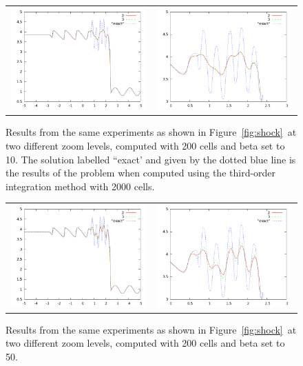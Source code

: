 \documentclass[10pt]{article}
\begin{document}
\begin{figure}
  \begin{center}
	\begin{tabular}{cc}
      \includegraphics[width=.475\textwidth]{10.png} &
	  \includegraphics[width=.475\textwidth]{10zoom.png}
	\end{tabular}
  \end{center}
  \caption{Results from the same experiments as shown in Figure~\ref{fig:shock}~at two different zoom levels, computed with 200 cells and beta set to 10. The solution labelled ``exact' and given by the dotted blue line is the results of the problem when computed using the third-order integration method with 2000 cells.}
\end{figure}

\begin{figure}
  \begin{center}
	\begin{tabular}{cc}
      \includegraphics[width=.475\textwidth]{50.png} &
	  \includegraphics[width=.475\textwidth]{50zoom.png}
	\end{tabular}
  \end{center}
  \caption{Results from the same experiments as shown in Figure~\ref{fig:shock}~at two different zoom levels, computed with 200 cells and beta set to 50.}
\end{figure}
\end{document}

